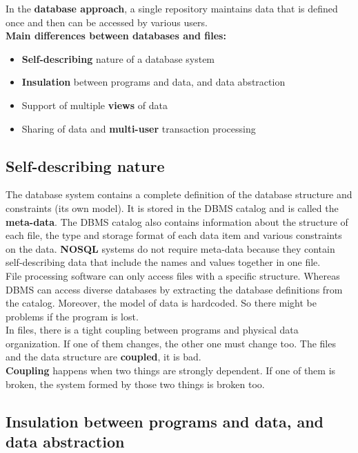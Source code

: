 In the \textbf{database approach}, a single repository maintains data that is defined once and then can be accessed by various users.\\

\textbf{Main differences between databases and files:}
\begin{itemize}
    \item \textbf{Self-describing} nature of a database system
    \item \textbf{Insulation} between programs and data, and data abstraction
    \item Support of multiple \textbf{views} of data
    \item Sharing of data and \textbf{multi-user} transaction processing
\end{itemize}

\subsection{Self-describing nature}
The database system contains a complete definition of the database structure and constraints (its own model). It is stored in the DBMS catalog and is called the \textbf{meta-data}. The DBMS catalog also contains information about the structure of each file, the type and storage format of each data item and various constraints on the data. \textbf{NOSQL} systems do not require meta-data because they contain self-describing data that include the names and values together in one file.\\

File processing software can only access files with a specific structure. Whereas DBMS can access diverse databases by extracting the database definitions from the catalog. Moreover, the model of data is hardcoded. So there might be problems if the program is lost.\\

In files, there is a tight coupling between programs and physical data organization. If one of them changes, the other one must change too. The files and the data structure are \textbf{coupled}, it is bad.\\

\textbf{Coupling} happens when two things are strongly dependent. If one of them is broken, the system formed by those two things is broken too.

\subsection{Insulation between programs and data, and data abstraction}

